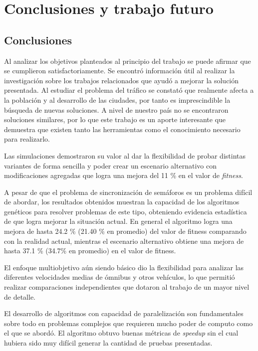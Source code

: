 \chapter{Conclusiones y trabajo futuro}

\section{Conclusiones}
Al analizar los objetivos planteados al principio del trabajo se puede afirmar que se cumplieron satisfactoriamente.
Se encontró información útil al realizar la investigación sobre los trabajos relacionados que ayudó a mejorar la solución presentada. 
Al estudiar el problema del tráfico se constató que realmente afecta a la población y al desarrollo de las ciudades, por tanto es imprescindible la búsqueda de nuevas soluciones. A nivel de nuestro país no se encontraron soluciones similares, por lo que este trabajo es un aporte interesante que demuestra que existen tanto las herramientas como el conocimiento necesario para realizarlo.
 
Las simulaciones demostraron su valor al dar la flexibilidad de probar distintas variantes de forma sencilla y poder crear un escenario alternativo con modificaciones agregadas que logra una mejora del 11 \% en el valor de \emph{fitness}.
 
A pesar de que el problema de sincronización de semáforos es un problema difícil de abordar, los resultados obtenidos muestran la capacidad de los algoritmos genéticos para resolver problemas de este tipo, obteniendo evidencia estadística de que logra mejorar la situación actual. En general el algoritmo logra una mejora de hasta  24.2 \% (21.40 \% en promedio) del valor de fitness comparando con la realidad actual, mientras el escenario alternativo obtiene una mejora de hasta 37.1 \% (34.7\% en promedio) en el valor de fitness.

El enfoque multiobjetivo aún siendo básico dio la flexibilidad para analizar las diferentes velocidades medias de ómnibus y otros vehículos, lo que permitió realizar comparaciones independientes que dotaron al trabajo de un mayor nivel de detalle.

El desarrollo de algoritmos con capacidad de paralelización son fundamentales sobre  todo en problemas complejos que requieren mucho poder de computo como el que se abordó. El algoritmo obtuvo buenas métricas de \emph{speedup} sin el cual hubiera sido muy difícil generar la cantidad de pruebas presentadas.

